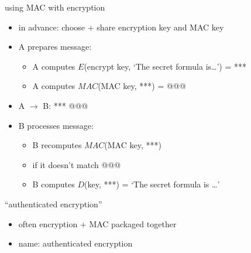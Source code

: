 \begin{frame}{using MAC with encryption}
    \begin{itemize}
    \item in advance: choose + share encryption key and MAC key
    \vspace{.5cm}
    \item A prepares message:
    \begin{itemize}
    \item A computes $E$(encrypt key, `The secret formula is\ldots') = ***
    \item A computes $MAC$(MAC key, ***) = @@@
    \end{itemize}
    \item A $\rightarrow$ B: *** @@@
    \item<2-> B processes message:
    \begin{itemize}
        \item B recomputes $MAC$(MAC key, ***)
        \item {} if it doesn't match @@@
        \item B computes $D$(key, ***) = `The secret formula is \ldots'
    \end{itemize}
    \end{itemize}
\end{frame}

\begin{frame}{``authenticated encryption''}
    \begin{itemize}
    \item often encryption + MAC packaged together
    \item name: authenticated encryption
    \end{itemize}
\end{frame}

